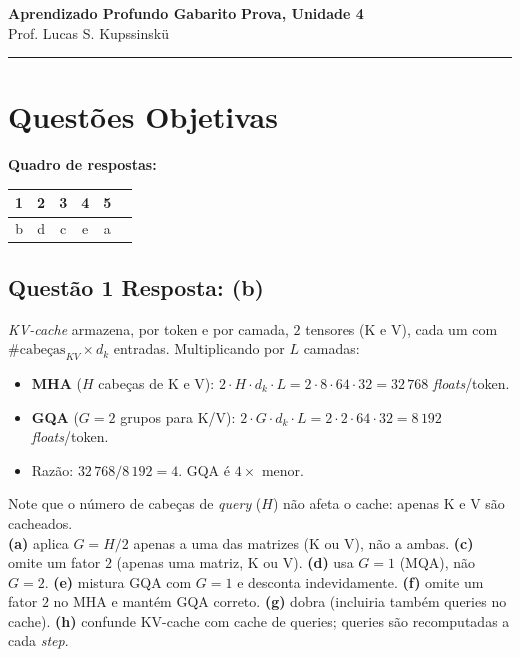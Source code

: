 \documentclass[11pt,a4paper]{article}
\begin{document}
{\Large\bfseries Aprendizado Profundo \textemdash{} Gabarito} \hfill \textbf{Prova, Unidade 4}\\
Prof. Lucas S. Kupssinskü

\rule{\linewidth}{0.8pt}

\section*{Questões Objetivas}

\textbf{Quadro de respostas:}
\begin{center}
\begin{tabular}{|c|c|c|c|c|c|}
\hline
1 & 2 & 3 & 4 & 5 \\\hline
b & d & c & e & a \\\hline
\end{tabular}
\end{center}

\color{blue}

\subsection*{Questão 1 \textemdash{} Resposta: (b)}
\textit{KV-cache} armazena, por token e por camada, $2$ tensores (K e V), cada um com $\#\text{cabeças}_{KV} \times d_k$ entradas. Multiplicando por $L$ camadas:
\begin{itemize}
    \item \textbf{MHA} ($H$ cabeças de K e V): $2 \cdot H \cdot d_k \cdot L = 2 \cdot 8 \cdot 64 \cdot 32 = 32\,768$ \textit{floats}/token.
    \item \textbf{GQA} ($G = 2$ grupos para K/V): $2 \cdot G \cdot d_k \cdot L = 2 \cdot 2 \cdot 64 \cdot 32 = 8\,192$ \textit{floats}/token.
    \item Razão: $32\,768 / 8\,192 = 4$. GQA é $4\times$ menor.
\end{itemize}
Note que o número de cabeças de \emph{query} ($H$) não afeta o cache: apenas K e V são cacheados.\\
\textbf{(a)} aplica $G = H/2$ apenas a uma das matrizes (K ou V), não a ambas.
\textbf{(c)} omite um fator $2$ (apenas uma matriz, K ou V).
\textbf{(d)} usa $G = 1$ (MQA), não $G = 2$.
\textbf{(e)} mistura GQA com $G = 1$ e desconta indevidamente.
\textbf{(f)} omite um fator $2$ no MHA e mantém GQA correto.
\textbf{(g)} dobra (incluiria também queries no cache).
\textbf{(h)} confunde KV-cache com cache de queries; queries são recomputadas a cada \textit{step}.
\end{document}
